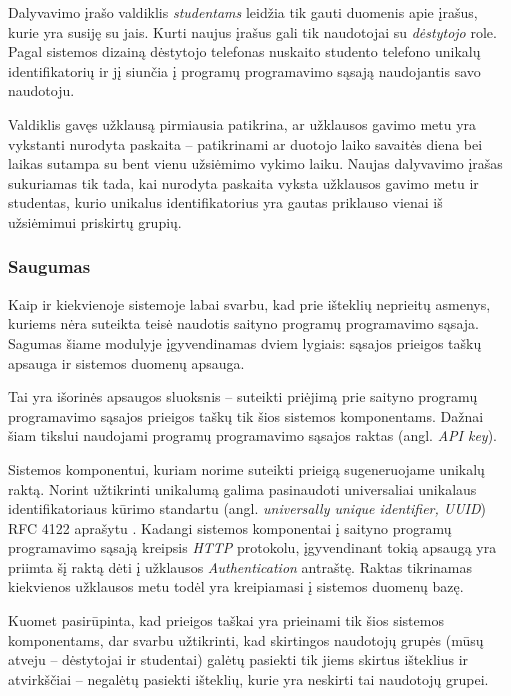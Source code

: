 \documentclass{VUMIFPSbakalaurinis}
\begin{document}

Dalyvavimo įrašo valdiklis \textit{studentams} leidžia tik gauti duomenis apie įrašus, kurie yra susiję su jais. Kurti naujus įrašus gali tik naudotojai su \textit{dėstytojo} role. Pagal sistemos dizainą dėstytojo telefonas nuskaito studento telefono unikalų identifikatorių ir jį siunčia į programų programavimo sąsają naudojantis savo naudotoju.

Valdiklis gavęs užklausą pirmiausia patikrina, ar užklausos gavimo metu yra vykstanti nurodyta paskaita – patikrinami ar duotojo laiko savaitės diena bei laikas sutampa su bent vienu užsiėmimo vykimo laiku. Naujas dalyvavimo įrašas sukuriamas tik tada, kai nurodyta paskaita vyksta užklausos gavimo metu ir studentas, kurio unikalus identifikatorius yra gautas priklauso vienai iš užsiėmimui priskirtų grupių.

\subsubsection{Saugumas}

Kaip ir kiekvienoje sistemoje labai svarbu, kad prie išteklių neprieitų asmenys, kuriems nėra suteikta teisė naudotis saityno programų programavimo sąsaja. Sagumas šiame modulyje įgyvendinamas dviem lygiais: sąsajos prieigos taškų apsauga ir sistemos duomenų apsauga.

 \label{apiKeySecurity}

Tai yra išorinės apsaugos sluoksnis – suteikti priėjimą prie saityno programų programavimo sąsajos prieigos taškų tik šios sistemos komponentams. Dažnai šiam tikslui naudojami programų programavimo sąsajos raktas (angl. \textit{API key}).

Sistemos komponentui, kuriam norime suteikti prieigą sugeneruojame unikalų raktą. Norint užtikrinti unikalumą galima pasinaudoti universaliai unikalaus identifikatoriaus kūrimo standartu (angl. \textit{universally unique identifier, UUID}) RFC 4122 aprašytu \cite{uuidRef}. Kadangi sistemos komponentai į saityno programų programavimo sąsają kreipsis \textit{HTTP} protokolu, įgyvendinant tokią apsaugą yra priimta šį raktą dėti į užklausos \textit{Authentication} antraštę. Raktas tikrinamas kiekvienos užklausos metu todėl yra kreipiamasi į sistemos duomenų bazę.


Kuomet pasirūpinta, kad prieigos taškai yra prieinami tik šios sistemos komponentams, dar svarbu užtikrinti, kad skirtingos naudotojų grupės (mūsų atveju – dėstytojai ir studentai) galėtų pasiekti tik jiems skirtus išteklius ir atvirkščiai – negalėtų pasiekti išteklių, kurie yra neskirti tai naudotojų grupei.
\end{document}
